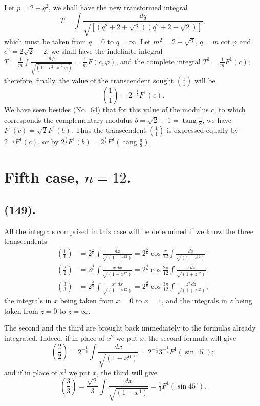 \documentclass{article}
\begin{document}
Let $p=2+q^{2}$, we shall have the new transformed integral
\[ T=\int\frac{dq}{\sqrt{[(q^{2}+2+\sqrt{2})(q^{2}+2-\sqrt{2})]}}, \]
which must be taken from $q=0$ to $q=\infty$. Let $m^{2}=2+\sqrt{2}$, $q=m\cot\varphi$ and $c^{2}=2\sqrt{2}-2$, we shall have the indefinite integral $T=\displaystyle\frac{1}{m}\int\frac{d\varphi}{\sqrt{(1-c^{2}\sin^{2}\varphi)}}=\frac{1}{m}F(c,\varphi)$, and the complete integral $T^{1}=\frac{1}{m}F^{1}(c)$; therefore, finally, the value of the transcendent sought $\left(\frac{1}{1}\right)$ will be
\[ \left(\frac{1}{1}\right)=2^{-\frac{1}{4}}F^{1}(c). \]
We have seen besides (No.~64) that for this value of the modulus $c$, to which corresponds the complementary modulus $b=\sqrt{2}-1=\operatorname{tang}\frac{\pi}{8}$, we have $F^{1}(c)=\sqrt{2}F^{1}(b)$. Thus the transcendent $\left(\frac{1}{1}\right)$ is expressed equally by $2^{-\frac{1}{4}}F^{1}(c)$, or by $2^{\frac{1}{4}}F^{1}(b)=2^{\frac{1}{4}}F^{1}\left(\operatorname{tang}\frac{\pi}{8}\right)$.


\section*{Fifth case, $n=12$.}

\subsection*{(149).}

All the integrals comprised in this case will be determined if we know the three transcendents
\[ \begin{aligned} \left(\frac{1}{1}\right)&=2^{\frac{5}{6}}\int\frac{dx}{\sqrt{(1-x^{12})}}=2^{\frac{5}{6}}\cos\frac{\pi}{12}\int\frac{dz}{\sqrt{(1+z^{12})}}\\ \left(\frac{2}{2}\right)&=2^{\frac{4}{6}}\int\frac{x\,dx}{\sqrt{(1-x^{12})}}=2^{\frac{4}{6}}\cos\frac{2\pi}{12}\int\frac{z\,dz}{\sqrt{(1+z^{12})}}\\ \left(\frac{3}{3}\right)&=2^{\frac{3}{6}}\int\frac{x^{2}\,dx}{\sqrt{(1-x^{12})}}=2^{\frac{3}{6}}\cos\frac{3\pi}{12}\int\frac{z^{2}\,dz}{\sqrt{(1+z^{12})}}, \end{aligned} \]
the integrals in $x$ being taken from $x=0$ to $x=1$, and the integrals in $z$ being taken from $z=0$ to $z=\infty$.

The second and the third are brought back immediately to the formulas already integrated. Indeed, if in place of $x^{2}$ we put $x$, the second formula will give
\[ \left(\frac{2}{2}\right)=2^{-\frac{1}{3}}\int\frac{dx}{\sqrt{(1-x^{6})}}=2^{-\frac{1}{3}}3^{-\frac{1}{4}}F^{1}(\sin 15^{\circ}); \]
and if in place of $x^{3}$ we put $x$, the third will give
\[ \left(\frac{3}{3}\right)=\frac{\sqrt{2}}{3}\int\frac{dx}{\sqrt{(1-x^{4})}}=\tfrac{1}{3}F^{1}(\sin 45^{\circ}). \]
\end{document}
